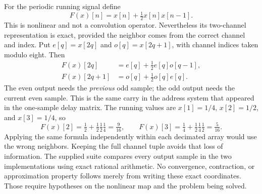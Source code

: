 For the periodic running signal define
\[
F(x)[n]=x[n]+\tfrac12x[n]x[n-1].
\]
This is nonlinear and not a convolution operator. Nevertheless its two-channel representation is exact, provided the neighbor comes from the correct channel and index.
Put $e[q]=x[2q]$ and $o[q]=x[2q+1]$, with channel indices taken modulo eight. Then
\[
\begin{aligned}
F(x)[2q]&=e[q]+\tfrac12 e[q]o[q-1],\\
F(x)[2q+1]&=o[q]+\tfrac12 o[q]e[q].
\end{aligned}
\]
The even output needs the \emph{previous} odd sample; the odd output needs the current even sample. This is the same carry in the address system that appeared in the one-sample delay matrix.
The running values are $x[1]=1/4$, $x[2]=1/2$, and $x[3]=1/4$, so
\[
F(x)[2]=\tfrac12+\tfrac12\tfrac12\tfrac14=\tfrac9{16},
\qquad F(x)[3]=\tfrac14+\tfrac12\tfrac14\tfrac12=\tfrac5{16}.
\]
Applying the same formula independently within each decimated array would use the wrong neighbors. Keeping the full channel tuple avoids that loss of information. The supplied suite compares every output sample in the two implementations using exact rational arithmetic.
No convergence, contraction, or approximation property follows merely from writing these exact coordinates. Those require hypotheses on the nonlinear map and the problem being solved.

